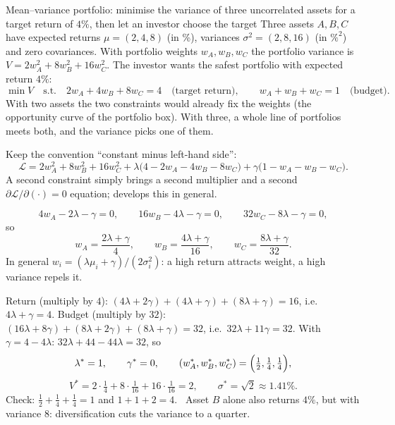 \begin{worked}{Mean--variance portfolio: minimise the variance of three uncorrelated assets for a target return of $4\%$, then let an investor choose the target}
Three assets $A,B,C$ have expected returns $\mu=(2,4,8)$ (in \%),
variances $\sigma^{2}=(2,8,16)$ (in $\%^{2}$) and zero covariances. With
portfolio weights $w_A,w_B,w_C$ the portfolio variance is
$V=2w_A^{2}+8w_B^{2}+16w_C^{2}$. The investor wants the safest portfolio
with expected return $4\%$:
\[
  \min V \quad\text{s.t.}\quad 2w_A+4w_B+8w_C=4
  \quad\text{(target return)},\qquad
  w_A+w_B+w_C=1 \quad\text{(budget)} .
\]
With two assets the two constraints would already fix the weights (the
opportunity curve of the portfolio box). With three, a whole line of
portfolios meets both, and the variance picks one of them.

Keep the convention ``constant minus left-hand side'':
\[
  \mathcal L=2w_A^{2}+8w_B^{2}+16w_C^{2}
  +\lambda\bigl(4-2w_A-4w_B-8w_C\bigr)
  +\gamma\bigl(1-w_A-w_B-w_C\bigr).
\]
A second constraint simply brings a second multiplier and a second
$\partial\mathcal L/\partial(\cdot)=0$ equation; 
develops this in general.

\[
  4w_A-2\lambda-\gamma=0,\qquad
  16w_B-4\lambda-\gamma=0,\qquad
  32w_C-8\lambda-\gamma=0,
\]
so
\[
  w_A=\frac{2\lambda+\gamma}{4},\qquad
  w_B=\frac{4\lambda+\gamma}{16},\qquad
  w_C=\frac{8\lambda+\gamma}{32}.
\]
In general $w_i=(\lambda\mu_i+\gamma)/(2\sigma_i^{2})$: a high return
attracts weight, a high variance repels it.

Return (multiply by $4$): $(4\lambda+2\gamma)+(4\lambda+\gamma)
+(8\lambda+\gamma)=16$, i.e.\ $4\lambda+\gamma=4$. Budget (multiply by
$32$): $(16\lambda+8\gamma)+(8\lambda+2\gamma)+(8\lambda+\gamma)=32$, i.e.\
$32\lambda+11\gamma=32$. With $\gamma=4-4\lambda$: $32\lambda+44-44\lambda=32$,
so
\[
  \lambda^{*}=1,\qquad \gamma^{*}=0,\qquad
  (w_A^{*},w_B^{*},w_C^{*})=\Bigl(\tfrac12,\tfrac14,\tfrac14\Bigr),
\]
\[
  V^{*}=2\cdot\tfrac14+8\cdot\tfrac1{16}+16\cdot\tfrac1{16}=2,
  \qquad \sigma^{*}=\sqrt2\approx1.41\% .
\]
Check: $\tfrac12+\tfrac14+\tfrac14=1$ and $1+1+2=4$. \checkmark\ Asset $B$
alone also returns $4\%$, but with variance $8$: diversification cuts the
variance to a quarter.


\end{worked}
